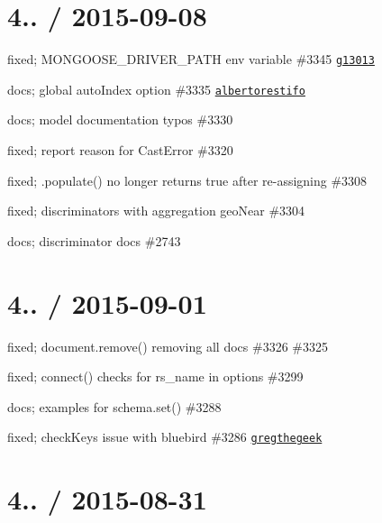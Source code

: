 \section*{4.. / 2015-\/09-\/08 }


\begin{DoxyItemize}
\item fixed; M\+O\+N\+G\+O\+O\+S\+E\+\_\+\+D\+R\+I\+V\+E\+R\+\_\+\+P\+A\+TH env variable \#3345 \href{https://github.com/g13013}{\tt g13013}
\item docs; global auto\+Index option \#3335 \href{https://github.com/albertorestifo}{\tt albertorestifo}
\item docs; model documentation typos \#3330
\item fixed; report reason for Cast\+Error \#3320
\item fixed; .populate() no longer returns true after re-\/assigning \#3308
\item fixed; discriminators with aggregation geo\+Near \#3304
\item docs; discriminator docs \#2743
\end{DoxyItemize}

\section*{4.. / 2015-\/09-\/01 }


\begin{DoxyItemize}
\item fixed; document.\+remove() removing all docs \#3326 \#3325
\item fixed; connect() checks for rs\+\_\+name in options \#3299
\item docs; examples for schema.\+set() \#3288
\item fixed; check\+Keys issue with bluebird \#3286 \href{https://github.com/gregthegeek}{\tt gregthegeek}
\end{DoxyItemize}

\section*{4.. / 2015-\/08-\/31 }


